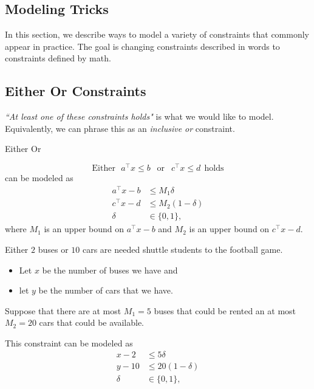 \documentclass[../open-optimization/open-optimization.tex]{subfiles}
\begin{document}
\subsection{Modeling Tricks}
In this section, we describe ways to model a variety of constraints that commonly appear in practice.  The goal is changing constraints described in words to constraints defined by math.
\subsection{Either Or Constraints}
\emph{``At least one of these constraints holds"} is what we would like to model.  Equivalently, we can phrase this as an \emph{inclusive or} constraint.  
\begin{general}{Either Or}{}{}

\begin{equation}
\text{Either} \ \ \ a^\top x \leq b\ \  \text{  or  } \ \  c^\top x \leq d \ \ \text{holds} 
\end{equation}
can be modeled as 
\begin{equation}
\begin{split}
a^\top x - b &\leq M_1 \delta\\
c^\top x - d &\leq M_2 (1-\delta)\\
\delta &\in \{0,1\},
\end{split}
\end{equation}
where $M_1$ is an upper bound on $a^\top x - b$ and $M_2$ is an upper bound on $c^\top x - d$.
\end{general}

\begin{example}{}{}
Either $2$ buses or $10$ cars are needed shuttle students to the football game.  
\begin{itemize}
\item Let $x$ be the number of buses we have and 
\item let $y$ be the number of cars that we have.  
\end{itemize}
Suppose that there are at most $M_1 = 5$ buses that could be rented an at most $M_2 = 20$ cars that could be available.

This constraint can be modeled as 
\begin{equation}
\begin{split}
x - 2 &\leq 5\delta\\
y - 10 &\leq 20 (1-\delta)\\
\delta &\in \{0,1\},
\end{split}
\end{equation}
\end{example}
\end{document}

